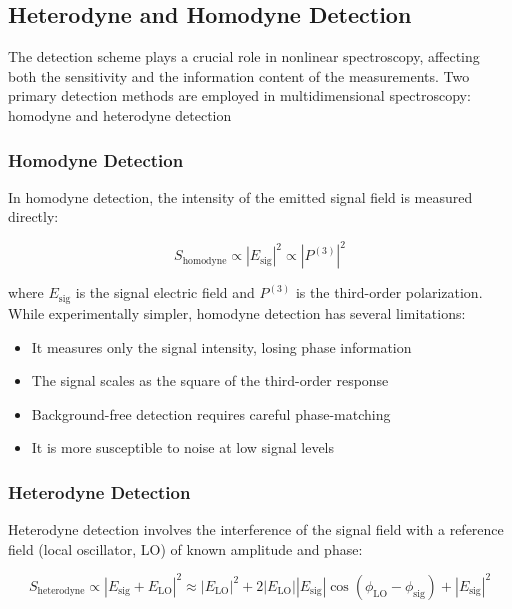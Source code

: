 \subsection{Heterodyne and Homodyne Detection}
\label{subsec:heterodyne_homodyne}

\noindent The detection scheme plays a crucial role in nonlinear spectroscopy, affecting both the sensitivity and the information content of the measurements. Two primary detection methods are employed in multidimensional spectroscopy: homodyne and heterodyne detection %

\subsubsection{Homodyne Detection}
\label{subsubsec:homodyne}

\noindent In homodyne detection, the intensity of the emitted signal field is measured directly:

\begin{equation}
	S_{\text{homodyne}} \propto |E_{\text{sig}}|^2 \propto |P^{(3)}|^2
	\label{eq:homodyne}
\end{equation}

\noindent where $E_{\text{sig}}$ is the signal electric field and $P^{(3)}$ is the third-order polarization. While experimentally simpler, homodyne detection has several limitations:

\begin{itemize}
	\item It measures only the signal intensity, losing phase information
	\item The signal scales as the square of the third-order response
	\item Background-free detection requires careful phase-matching
	\item It is more susceptible to noise at low signal levels
\end{itemize}

\subsubsection{Heterodyne Detection}
\label{subsubsec:heterodyne}

\noindent Heterodyne detection involves the interference of the signal field with a reference field (local oscillator, LO) of known amplitude and phase:

\begin{equation}
	S_{\text{heterodyne}} \propto |E_{\text{sig}} + E_{\text{LO}}|^2 \approx |E_{\text{LO}}|^2 + 2|E_{\text{LO}}||E_{\text{sig}}|\cos(\phi_{\text{LO}} - \phi_{\text{sig}}) + |E_{\text{sig}}|^2
	\label{eq:heterodyne}
\end{equation}

